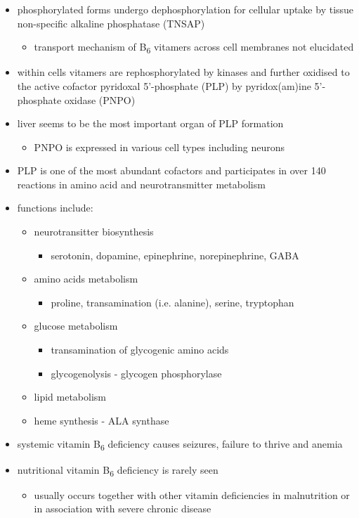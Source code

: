 \documentclass[12pt]{scrartcl}
\begin{document}
\begin{itemize}
\item phosphorylated forms undergo dephosphorylation for cellular uptake
by tissue non-specific alkaline phosphatase (TNSAP)
\begin{itemize}
\item transport mechanism of B\textsubscript{6} vitamers across cell membranes not
elucidated
\end{itemize}
\item within cells vitamers are rephosphorylated by kinases and further oxidised to the
active cofactor pyridoxal 5’-phosphate (PLP) by pyridox(am)ine
5’-phosphate oxidase (PNPO)
\item liver seems to be the most important organ of PLP formation
\begin{itemize}
\item PNPO is expressed in various cell types including neurons
\end{itemize}
\item PLP is one of the most abundant cofactors and participates in over
140 reactions in amino acid and neurotransmitter metabolism
\item functions include:
\begin{itemize}
\item neurotransitter biosynthesis
\begin{itemize}
\item serotonin, dopamine, epinephrine, norepinephrine, GABA
\end{itemize}
\item amino acids metabolism
\begin{itemize}
\item proline, transamination (i.e. alanine), serine, tryptophan
\end{itemize}
\item glucose metabolism
\begin{itemize}
\item transamination of glycogenic amino acids
\item glycogenolysis - glycogen phosphorylase
\end{itemize}
\item lipid metabolism
\item heme synthesis - ALA synthase
\end{itemize}
\item systemic vitamin B\textsubscript{6} deficiency causes seizures, failure to thrive
and anemia
\item nutritional vitamin B\textsubscript{6} deficiency is rarely seen
\begin{itemize}
\item usually occurs together with other vitamin deficiencies in
malnutrition or in association with severe chronic disease
\end{itemize}
\end{itemize}
\end{document}
